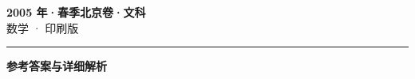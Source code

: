 \documentclass[zihao=5, a4paper]{ctexart}
\begin{document}
\begin{center}
  {\Large\bfseries 2005 年·春季北京卷·文科}\\[4pt]
  {\large 数学 · 印刷版}
\end{center}
\medskip
{}

\par\bigskip\hrule\bigskip
{}
\begin{center}{\large\bfseries 参考答案与详细解析}\end{center}
\smallskip

\end{document}
